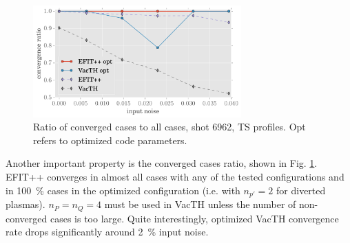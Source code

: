\begin{figure}
\centering   %
\hfill{}
\includegraphics[width=8cm]{convergence_ratio_6962.pdf}
\hfill{}
\caption{Ratio of converged cases to all cases, shot 6962, TS profiles. Opt refers to optimized code parameters.}
\label{fig:convergence_ratio}
\end{figure}

Another important property is the converged cases ratio, shown in Fig. \ref{fig:convergence_ratio}. EFIT++ converges in almost all cases with any of the tested configurations and in 100~\% cases in the optimized configuration (i.e. with $n_{p'}=2$ for diverted plasmas). $n_P = n_Q = 4$ must be used in VacTH unless the number of non-converged cases is too large. 
Quite interestingly, optimized VacTH convergence rate drops significantly around 2~\% input noise.


